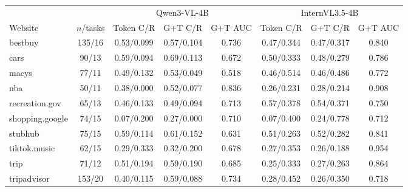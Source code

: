 \begin{tabular}{@{}lccccccc@{}}
\toprule
 & & \multicolumn{3}{c}{Qwen3-VL-4B} & \multicolumn{3}{c}{InternVL3.5-4B} \\
\cmidrule(lr){3-5}\cmidrule(lr){6-8}
Website & $n$/tasks & Token C/R & G+T C/R & G+T AUC & Token C/R & G+T C/R & G+T AUC \\
\midrule
bestbuy & 135/16 & 0.53/0.099 & 0.57/0.104 & 0.736 & 0.47/0.344 & 0.47/0.317 & 0.840 \\
cars & 90/13 & 0.59/0.094 & 0.69/0.113 & 0.672 & 0.50/0.333 & 0.48/0.279 & 0.786 \\
macys & 77/11 & 0.49/0.132 & 0.53/0.049 & 0.518 & 0.46/0.514 & 0.46/0.486 & 0.772 \\
nba & 50/11 & 0.38/0.000 & 0.52/0.077 & 0.836 & 0.26/0.231 & 0.28/0.214 & 0.908 \\
recreation.gov & 65/13 & 0.46/0.133 & 0.49/0.094 & 0.713 & 0.57/0.378 & 0.54/0.371 & 0.750 \\
shopping.google & 74/15 & 0.07/0.200 & 0.27/0.000 & 0.710 & 0.07/0.400 & 0.24/0.778 & 0.712 \\
stubhub & 75/15 & 0.59/0.114 & 0.61/0.152 & 0.631 & 0.51/0.263 & 0.52/0.282 & 0.841 \\
tiktok.music & 62/15 & 0.29/0.333 & 0.32/0.200 & 0.678 & 0.27/0.353 & 0.26/0.188 & 0.954 \\
trip & 71/12 & 0.51/0.194 & 0.59/0.190 & 0.685 & 0.25/0.333 & 0.27/0.263 & 0.864 \\
tripadvisor & 153/20 & 0.40/0.115 & 0.59/0.088 & 0.734 & 0.28/0.452 & 0.26/0.350 & 0.718 \\
\bottomrule
\end{tabular}
